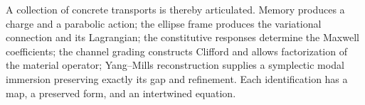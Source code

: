 A collection of concrete transports is thereby articulated. Memory
produces a charge and a parabolic action; the ellipse frame produces
the variational connection and its Lagrangian; the constitutive responses
determine the Maxwell coefficients; the channel grading constructs
Clifford and allows factorization of the material operator; Yang--Mills
reconstruction supplies a symplectic modal immersion preserving exactly
its gap and refinement. Each identification has a map,
a preserved form, and an intertwined equation.

